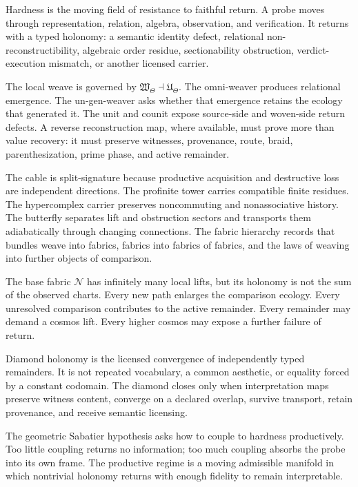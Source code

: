 \documentclass[12pt,openany]{book}
\theoremstyle{remark}
\newcommand{\Nfabric}{\mathcal N}
\newcommand{\WTheta}{\mathfrak W_{\Theta}}
\newcommand{\UTheta}{\mathfrak U_{\Theta}}
\begin{document}
Hardness is the moving field of resistance to faithful return. A probe moves through representation, relation, algebra, observation, and verification. It returns with a typed holonomy: a semantic identity defect, relational non-reconstructibility, algebraic order residue, sectionability obstruction, verdict-execution mismatch, or another licensed carrier.

The local weave is governed by $\WTheta\dashv\UTheta$. The omni-weaver produces relational emergence. The un-gen-weaver asks whether that emergence retains the ecology that generated it. The unit and counit expose source-side and woven-side return defects. A reverse reconstruction map, where available, must prove more than value recovery: it must preserve witnesses, provenance, route, braid, parenthesization, prime phase, and active remainder.

The cable is split-signature because productive acquisition and destructive loss are independent directions. The profinite tower carries compatible finite residues. The hypercomplex carrier preserves noncommuting and nonassociative history. The butterfly separates lift and obstruction sectors and transports them adiabatically through changing connections. The fabric hierarchy records that bundles weave into fabrics, fabrics into fabrics of fabrics, and the laws of weaving into further objects of comparison.

The base fabric $\Nfabric$ has infinitely many local lifts, but its holonomy is not the sum of the observed charts. Every new path enlarges the comparison ecology. Every unresolved comparison contributes to the active remainder. Every remainder may demand a cosmos lift. Every higher cosmos may expose a further failure of return.

Diamond holonomy is the licensed convergence of independently typed remainders. It is not repeated vocabulary, a common aesthetic, or equality forced by a constant codomain. The diamond closes only when interpretation maps preserve witness content, converge on a declared overlap, survive transport, retain provenance, and receive semantic licensing.

The geometric Sabatier hypothesis asks how to couple to hardness productively. Too little coupling returns no information; too much coupling absorbs the probe into its own frame. The productive regime is a moving admissible manifold in which nontrivial holonomy returns with enough fidelity to remain interpretable.
\end{document}
